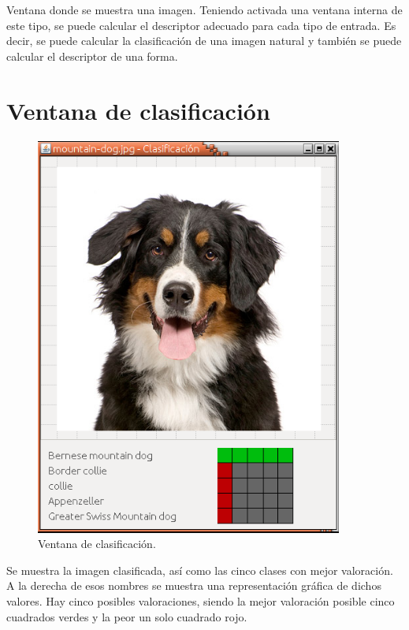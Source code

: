 Ventana donde se muestra una imagen. Teniendo activada una ventana interna de este tipo, se puede calcular el descriptor adecuado para cada tipo de entrada. Es decir, se puede calcular la clasificación de una imagen natural y también  se puede calcular el descriptor de una forma.\\



\newpage
\section{Ventana de clasificación}
\begin{figure}[H]
\begin{center}

\includegraphics[width=0.9\textwidth]{img/v-clasificacion.png}
\end{center}

\caption{Ventana de clasificación.}
\end{figure}

Se muestra la imagen clasificada, así como las cinco clases con mejor valoración. A la derecha de esos nombres se muestra una representación gráfica de dichos valores. Hay cinco posibles valoraciones, siendo la mejor valoración posible cinco cuadrados verdes y la peor un solo cuadrado rojo.\\
 

